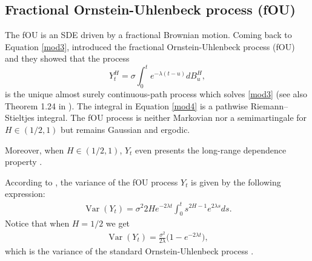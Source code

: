 \documentclass[smallextended]{svjour3}
\DeclareMathOperator{\Var}{Var}
\begin{document}
    \subsection{Fractional Ornstein-Uhlenbeck process (fOU)}\label{sect-OU}

        The fOU is an SDE driven by a fractional Brownian motion. 
    Coming back to Equation \eqref{mod3}, \cite{ch-ka-ma}
    introduced the fractional Ornstein-Uhlenbeck process (fOU) and they 
    showed that the process
    \begin{equation}
        Y_t ^ H = 
            \sigma \int_0 ^ t e ^ {-\lambda(t - u)} dB_u^H, 
        \label{mod4}
    \end{equation}
    is the unique almost surely continuous-path process which solves 
    \eqref{mod3} (see also Theorem 1.24 in \cite{ra}).
    The integral in Equation \eqref{mod4} is a
    pathwise Riemann–Stieltjes integral.  The fOU process is neither Markovian 
    nor a semimartingale for $H \in(1/2,1)$  \citep[see][]{du-no} but remains
    Gaussian and ergodic.

    Moreover, when $H \in(1/2,1)$, $Y_t$ even presents the long-range dependence
    property \cite{ch-ka-ma,ra}.

    According to \cite{ze-ch-ya}, the variance of the fOU process $Y_t$ is 
    given by the following expression:
    \begin{align}
        \Var(Y_t)= 
            \sigma^2 2H e^{-2\lambda t} 
            \int_0^t s^{2H-1} e^{2\lambda s} ds.\label{var-fou}
    \end{align}
    Notice that when $H=1/2$ we get
    \begin{align}
        \Var(Y_t)= \frac{\sigma^2}{2\lambda}  \big(1-e^{-2\lambda t}\big),
    \end{align}
    which is the variance of the standard Ornstein-Uhlenbeck process 
   \citep[see][p. 143]{mik}. 
\end{document}
